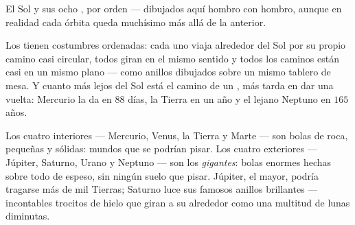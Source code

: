 \begin{omfigure}

{\small El Sol y sus ocho , por orden --- dibujados aquí
hombro con hombro, aunque en realidad cada órbita queda muchísimo más
allá de la anterior.}
\end{omfigure}

\begin{proposition}\label{prop:g4:solar-system:habits}
Los  tienen costumbres ordenadas: cada uno viaja alrededor
del Sol por su propio camino casi circular, todos giran en el mismo
sentido y todos los caminos están casi en un mismo plano --- como
anillos dibujados sobre un mismo tablero de mesa. Y cuanto más lejos
del Sol está el camino de un , más tarda en dar una vuelta:
Mercurio la da en $88$ días, la Tierra en un año y el lejano Neptuno
en $165$ años.
\end{proposition}

\begin{example}\label{ex:g4:solar-system:kinds}
Los cuatro  interiores --- Mercurio, Venus, la Tierra y
Marte --- son bolas de roca, pequeñas y sólidas: mundos que se
podrían pisar. Los cuatro exteriores --- Júpiter, Saturno, Urano y
Neptuno --- son los \emph{gigantes}: bolas enormes hechas sobre todo
de  espeso, sin ningún suelo que pisar. Júpiter, el mayor,
podría tragarse más de mil Tierras; Saturno luce sus famosos anillos
brillantes --- incontables trocitos de hielo que giran a su alrededor
como una multitud de lunas diminutas.
\end{example}

